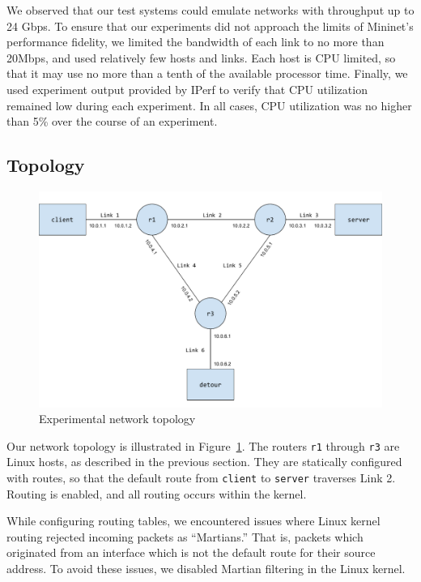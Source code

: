 \documentclass{cwru}
\begin{document}
We observed that our test systems could emulate networks with throughput up to
24 Gbps. To ensure that our experiments did not approach the limits of Mininet's
performance fidelity, we limited the bandwidth of each link to no more than
20Mbps, and used relatively few hosts and links. Each host is CPU limited, so
that it may use no more than a tenth of the available processor time. Finally,
we used experiment output provided by IPerf to verify that CPU utilization
remained low during each experiment. In all cases, CPU utilization was no higher
than 5\% over the course of an experiment.

\subsection{Topology}

\begin{figure}
  \centering
  \includegraphics[width=\textwidth]{figures/Topology.pdf}
  \caption{Experimental network topology}
  \label{fig:topo}
\end{figure}

Our network topology is illustrated in Figure~\ref{fig:topo}. The routers
\texttt{r1} through \texttt{r3} are Linux hosts, as described in the previous
section. They are statically configured with routes, so that the default route
from \texttt{client} to \texttt{server} traverses Link 2. Routing is enabled,
and all routing occurs within the kernel.

While configuring routing tables, we encountered issues where Linux kernel
routing rejected incoming packets as ``Martians.'' That is, packets which
originated from an interface which is not the default route for their source
address. To avoid these issues, we disabled Martian filtering in the Linux
kernel.
\end{document}
